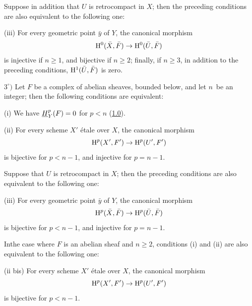 \begin{proposition}
Suppose in addition that $U$ is retrocompact in $X$; then the preceding conditions are also equivalent to the following one:

\textup{(iii)} For every geometric point $\bar{y}$ of $Y$, the canonical morphism
$$
\mathrm H^0(\bar{X}, \bar{F})\to \mathrm H^0(\bar{U}, \bar{F})
$$
is injective if $n\geq 1$, and bijective if $n\geq 2$; finally, if $n\geq 3$, in addition to the preceding conditions, $\mathrm H^1(\bar{U}, \bar{F})$ is zero.

$3^\circ)$ Let $F$ be a complex of abelian sheaves, bounded below, and let $n$~be an integer; then the following conditions are equivalent:

\textup{(i)} We have ${\mathop{\underline{H}}\nolimits}_Y^p(F)=0$ for $p<n$ (\cf \hyperref[XIV.1.0]{1.0}).

\textup{(ii)} For every scheme $X'$ \'{e}tale over $X$, the canonical morphism
$$
\mathrm H^p(X', F')\to \mathrm H^p(U', F')
$$
is bijective for $p<n-1$, and injective for $p=n-1$.

Suppose that $U$ is retrocompact in $X$; then the preceding conditions are also equivalent to the following one:

\textup{(iii)} For every geometric point $\bar{y}$ of $Y$, the canonical morphism
$$
\mathrm H^p(\bar{X}, \bar{F})\to \mathrm H^p(\bar{U}, \bar{F})$$
is bijective for $p<n-1$, and injective for $p=n-1$.

In\pageoriginale the case where $F$ is an abelian sheaf and $n\geq 2$, conditions \textup{(i)} and \textup{(ii)} are also equivalent to the following one:

\textup{(ii bis)} For every scheme $X'$ \'{e}tale over $X$, the canonical morphism
$$
\mathrm H^p(X', F')\to \mathrm H^p(U', F')$$
is bijective for $p<n-1$.
\end{proposition}

